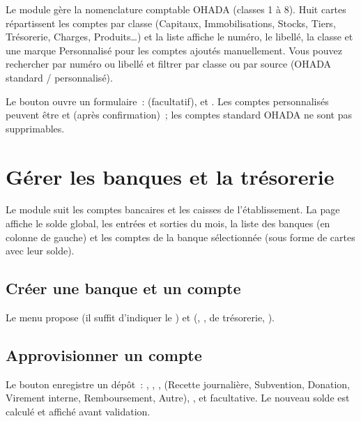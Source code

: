 Le module  gère la nomenclature comptable OHADA (classes 1 à 8). Huit cartes répartissent les comptes par classe (Capitaux, Immobilisations, Stocks, Tiers, Trésorerie, Charges, Produits\ldots) et la liste affiche le numéro, le libellé, la classe et une marque \og Personnalisé \fg{} pour les comptes ajoutés manuellement. Vous pouvez rechercher par numéro ou libellé et filtrer par classe ou par source (OHADA standard / personnalisé).

Le bouton  ouvre un formulaire~:  (facultatif),  et . Les comptes personnalisés peuvent être  et  (après confirmation)~; les comptes standard OHADA ne sont pas supprimables.


\section{Gérer les banques et la trésorerie}

Le module  suit les comptes bancaires et les caisses de l'établissement. La page affiche le solde global, les entrées et sorties du mois, la liste des banques (en colonne de gauche) et les comptes de la banque sélectionnée (sous forme de cartes avec leur solde).

\subsection{Créer une banque et un compte}

Le menu  propose  (il suffit d'indiquer le ) et  (, ,  de trésorerie, ).

\subsection{Approvisionner un compte}

Le bouton  enregistre un dépôt~: , , ,  (Recette journalière, Subvention, Donation, Virement interne, Remboursement, Autre), ,  et  facultative. Le nouveau solde est calculé et affiché avant validation.

